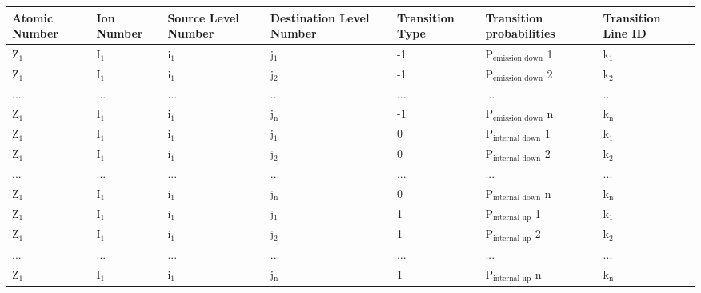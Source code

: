 \documentclass[letterpaper,10pt,english]{sphinxmanual}
\begin{document}
\begin{tabulary}{\linewidth}{|L|L|L|L|L|L|L|}
\hline
\textbf{
Atomic Number
} & \textbf{
Ion Number
} & \textbf{
Source Level Number
} & \textbf{
Destination Level Number
} & \textbf{
Transition Type
} & \textbf{
Transition probabilities
} & \textbf{
Transition Line ID
}\\\hline

Z$_{\text{1}}$
 & 
I$_{\text{1}}$
 & 
i$_{\text{1}}$
 & 
j$_{\text{1}}$
 & 
-1
 & 
P$_{\text{emission down}}$ 1
 & 
k$_{\text{1}}$
\\\hline

Z$_{\text{1}}$
 & 
I$_{\text{1}}$
 & 
i$_{\text{1}}$
 & 
j$_{\text{2}}$
 & 
-1
 & 
P$_{\text{emission down}}$ 2
 & 
k$_{\text{2}}$
\\\hline

...
 & 
...
 & 
...
 & 
...
 & 
...
 & 
...
 & 
...
\\\hline

Z$_{\text{1}}$
 & 
I$_{\text{1}}$
 & 
i$_{\text{1}}$
 & 
j$_{\text{n}}$
 & 
-1
 & 
P$_{\text{emission down}}$ n
 & 
k$_{\text{n}}$
\\\hline

Z$_{\text{1}}$
 & 
I$_{\text{1}}$
 & 
i$_{\text{1}}$
 & 
j$_{\text{1}}$
 & 
0
 & 
P$_{\text{internal down}}$ 1
 & 
k$_{\text{1}}$
\\\hline

Z$_{\text{1}}$
 & 
I$_{\text{1}}$
 & 
i$_{\text{1}}$
 & 
j$_{\text{2}}$
 & 
0
 & 
P$_{\text{internal down}}$ 2
 & 
k$_{\text{2}}$
\\\hline

...
 & 
...
 & 
...
 & 
...
 & 
...
 & 
...
 & 
...
\\\hline

Z$_{\text{1}}$
 & 
I$_{\text{1}}$
 & 
i$_{\text{1}}$
 & 
j$_{\text{n}}$
 & 
0
 & 
P$_{\text{internal down}}$ n
 & 
k$_{\text{n}}$
\\\hline

Z$_{\text{1}}$
 & 
I$_{\text{1}}$
 & 
i$_{\text{1}}$
 & 
j$_{\text{1}}$
 & 
1
 & 
P$_{\text{internal up}}$   1
 & 
k$_{\text{1}}$
\\\hline

Z$_{\text{1}}$
 & 
I$_{\text{1}}$
 & 
i$_{\text{1}}$
 & 
j$_{\text{2}}$
 & 
1
 & 
P$_{\text{internal up}}$   2
 & 
k$_{\text{2}}$
\\\hline

...
 & 
...
 & 
...
 & 
...
 & 
...
 & 
...
 & 
...
\\\hline

Z$_{\text{1}}$
 & 
I$_{\text{1}}$
 & 
i$_{\text{1}}$
 & 
j$_{\text{n}}$
 & 
1
 & 
P$_{\text{internal up}}$   n
 & 
k$_{\text{n}}$
\\\hline
\end{tabulary}
\end{document}
